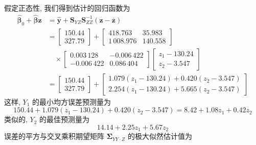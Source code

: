 假定正态性, 我们得到估计的回归函数为
\[
\begin{aligned}
\hat{\boldsymbol{\beta}}_0+\hat{\boldsymbol{\beta}}\mathbf{z}&=\hat{\mathbf{y}}+\mathbf{S}_{YZ}\mathbf{S}_{ZZ}^{-1}(\mathbf{z}-\bar{\mathbf{z}})\\
&=\left[\begin{array}{c}150.44\\327.79\end{array}\right]+\left[\begin{array}{cc}418.763&35.983\\1\,008.976&140.558\end{array}\right]\\
&\quad\times\left[\begin{array}{cc}0.003\,128&-0.006\,422\\-0.006\,422&0.086\,404\end{array}\right]\left[\begin{array}{c}z_1-130.24\\z_2-3.547\end{array}\right]\\
&=\left[\begin{array}{c}150.44\\327.79\end{array}\right]+\left[\begin{array}{c}1.079(z_1-130.24)+0.420(z_2-3.547)\\2.254(z_1-130.24)+5.665(z_2-3.547)\end{array}\right]
\end{aligned}
\]
这样, $Y_1$ 的最小均方误差预测量为
\[
150.44+1.079(z_1-130.24)+0.420(z_2-3.547)=8.42+1.08z_1+0.42z_2
\]
类似的, $Y_2$ 的最佳预测量为
\[
14.14+2.25z_1+5.67z_2
\]
误差的平方与交叉乘积期望矩阵 $\boldsymbol{\Sigma}_{YY\cdot Z}$ 的极大似然估计值为
